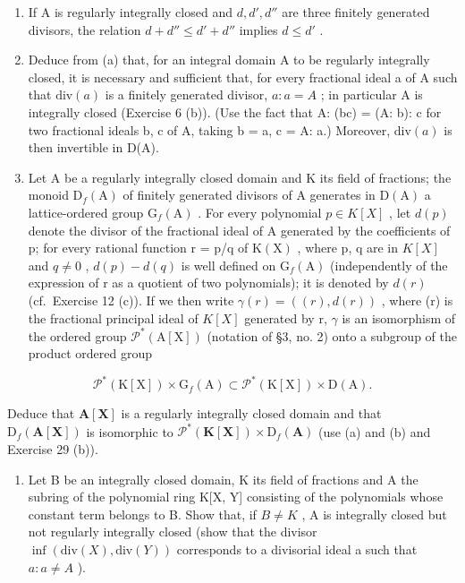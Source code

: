 \begin{enumerate}
\def\labelenumi{(\alph{enumi})}
\item
  If A is regularly integrally closed and \(d, d', d''\) are three finitely generated divisors, the relation \(d + d'' \leqslant d' + d''\) implies \(d \leqslant d'\) .
\item
  Deduce from (a) that, for an integral domain A to be regularly integrally closed, it is necessary and sufficient that, for every fractional ideal a of A such that \(\text{div}(a)\) is a finitely generated divisor, \(a: a = A\) ; in particular A is integrally closed (Exercise 6 (b)). (Use the fact that A: (bc) = (A: b): c for two fractional ideals b, c of A, taking b = a, c = A: a.) Moreover, \(\text{div}(a)\) is then invertible in D(A).
\item
  Let A be a regularly integrally closed domain and K its field of fractions; the monoid \(\mathrm{D}_{f}(\mathrm{A})\) of finitely generated divisors of A generates in \(\mathrm{D}(\mathrm{A})\) a lattice-ordered group \(\mathrm{G}_{f}(\mathrm{A})\) . For every polynomial \(p \in K[X]\) , let \(d(p)\) denote the divisor of the fractional ideal of A generated by the coefficients of p; for every rational function r = p/q of \(\mathrm{K}(\mathrm{X})\) , where p, q are in \(K[X]\) and \(q \neq 0\) , \(d(p) - d(q)\) is well defined on \(\mathrm{G}_{f}(\mathrm{A})\) (independently of the expression of r as a quotient of two polynomials); it is denoted by \(d(r)\) (cf.~Exercise 12 (c)). If we then write \(\gamma(r) = ((r), d(r))\) , where (r) is the fractional principal ideal of \(K[X]\) generated by r, \(\gamma\) is an isomorphism of the ordered group \(\mathcal{P}^{*}(\mathrm{A}[\mathrm{X}])\) (notation of §3, no. 2) onto a subgroup of the product ordered group
\end{enumerate}

\[
\mathscr {P} ^ {*} (\mathrm{K} [ \mathrm{X} ]) \times \mathrm{G} _ {f} (\mathrm{A}) \subset \mathscr {P} ^ {*} (\mathrm{K} [ \mathrm{X} ]) \times \mathrm{D} (\mathrm{A}).
\]

Deduce that \(\mathbf{A}[\mathbf{X}]\) is a regularly integrally closed domain and that \(\mathrm{D}_f(\mathbf{A}[\mathbf{X}])\) is isomorphic to \(\mathcal{P}^* (\mathbf{K}[\mathbf{X}])\times \mathrm{D}_f(\mathbf{A})\) (use (a) and (b) and Exercise 29 (b)).

\begin{enumerate}
\def\labelenumi{(\alph{enumi})}
\setcounter{enumi}{3}
\tightlist
\item
  Let B be an integrally closed domain, K its field of fractions and A the subring of the polynomial ring K{[}X, Y{]} consisting of the polynomials whose constant term belongs to B. Show that, if \(B \neq K\) , A is integrally closed but not regularly integrally closed (show that the divisor \(\inf(\text{div}(X), \text{div}(Y))\) corresponds to a divisorial ideal a such that \(a: a \neq A\) ).
\end{enumerate}

